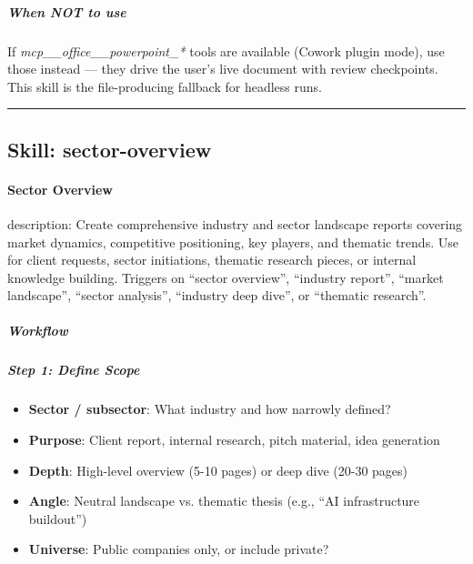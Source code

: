 \documentclass[11pt]{article}
\begin{document}
\subparagraph{When NOT to use}\mbox{}\par

If \emph{mcp\_\allowbreak{}\_\allowbreak{}office\_\allowbreak{}\_\allowbreak{}powerpoint\_\allowbreak{}*} tools are available (Cowork plugin mode), use those instead — they drive the user's live document with review checkpoints. This skill is the file-producing fallback for headless runs.


\vspace{0.8em}\hrule\vspace{0.8em}

\subsection{Skill: sector-overview}\label{file:pitch-agent-skills-sector-overview-SKILL-md}

\paragraph{Sector Overview}\mbox{}\par

description: Create comprehensive industry and sector landscape reports covering market dynamics, competitive positioning, key players, and thematic trends. Use for client requests, sector initiations, thematic research pieces, or internal knowledge building. Triggers on ``sector overview'', ``industry report'', ``market landscape'', ``sector analysis'', ``industry deep dive'', or ``thematic research''.


\subparagraph{Workflow}\mbox{}\par

\subparagraph{Step 1: Define Scope}\mbox{}\par

\begin{itemize}[leftmargin=*,itemsep=2pt,topsep=2pt]
\item {} \textbf{Sector / subsector}: What industry and how narrowly defined?
\item {} \textbf{Purpose}: Client report, internal research, pitch material, idea generation
\item {} \textbf{Depth}: High-level overview (5-10 pages) or deep dive (20-30 pages)
\item {} \textbf{Angle}: Neutral landscape vs. thematic thesis (e.g., ``AI infrastructure buildout'')
\item {} \textbf{Universe}: Public companies only, or include private?
\end{itemize}
\end{document}
